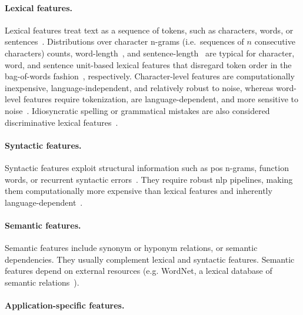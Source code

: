 \paragraph{Lexical features.} 
Lexical features treat text as a sequence of tokens, such as characters, words, or sentences~\citep{stamatatos_survey_2009}. 
Distributions over character n-grams (i.e.\ sequences of $n$ consecutive characters) counts, word-length~\citep{stein_intrinsic_2011}, and sentence-length~\citep{stein_intrinsic_2011,abbasi_writeprints_2008} are typical for character, word, and sentence unit-based lexical features that disregard token order in the bag-of-words fashion~\citep{neal_surveying_2018}, respectively. %
Character-level features are computationally inexpensive, language-independent, and relatively robust to noise, whereas word-level features require tokenization, are language-dependent, and more sensitive to noise~\citep{stamatatos_survey_2009}.
Idiosyncratic spelling or grammatical mistakes are also considered discriminative lexical features~\citep{abbasi_writeprints_2008,neal_surveying_2018}. 

\paragraph{Syntactic features.}
Syntactic features exploit structural information such as \ac{pos} n-grams, function words, or recurrent syntactic errors~\citep{stamatatos_survey_2009,abbasi_writeprints_2008}.
They require robust \ac{nlp} pipelines, making them computationally more expensive than lexical features and inherently language-dependent~\citep{neal_surveying_2018,stamatatos_survey_2009}.

\paragraph{Semantic features.}
Semantic features include synonym or hyponym relations, or semantic dependencies. 
They usually complement lexical and syntactic features. 
Semantic features depend on external resources (e.g. WordNet, a lexical database of semantic relations~\citep{wordnet_1995}).


\paragraph{Application-specific features.} %

